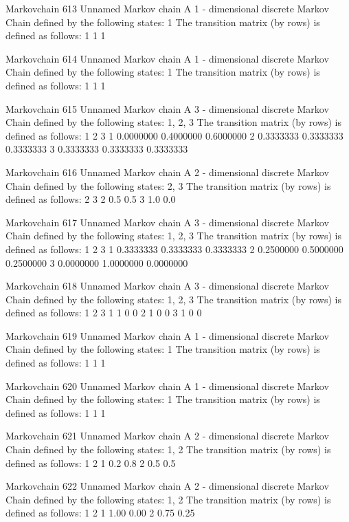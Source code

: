 \documentclass[
  nojss]{jss}
\begin{document}
\begin{CodeChunk}
\begin{CodeOutput}
Markovchain  613 
Unnamed Markov chain 
 A  1 - dimensional discrete Markov Chain defined by the following states: 
 1 
 The transition matrix  (by rows)  is defined as follows: 
  1
1 1

Markovchain  614 
Unnamed Markov chain 
 A  1 - dimensional discrete Markov Chain defined by the following states: 
 1 
 The transition matrix  (by rows)  is defined as follows: 
  1
1 1

Markovchain  615 
Unnamed Markov chain 
 A  3 - dimensional discrete Markov Chain defined by the following states: 
 1, 2, 3 
 The transition matrix  (by rows)  is defined as follows: 
          1         2         3
1 0.0000000 0.4000000 0.6000000
2 0.3333333 0.3333333 0.3333333
3 0.3333333 0.3333333 0.3333333

Markovchain  616 
Unnamed Markov chain 
 A  2 - dimensional discrete Markov Chain defined by the following states: 
 2, 3 
 The transition matrix  (by rows)  is defined as follows: 
    2   3
2 0.5 0.5
3 1.0 0.0

Markovchain  617 
Unnamed Markov chain 
 A  3 - dimensional discrete Markov Chain defined by the following states: 
 1, 2, 3 
 The transition matrix  (by rows)  is defined as follows: 
          1         2         3
1 0.3333333 0.3333333 0.3333333
2 0.2500000 0.5000000 0.2500000
3 0.0000000 1.0000000 0.0000000

Markovchain  618 
Unnamed Markov chain 
 A  3 - dimensional discrete Markov Chain defined by the following states: 
 1, 2, 3 
 The transition matrix  (by rows)  is defined as follows: 
  1 2 3
1 1 0 0
2 1 0 0
3 1 0 0

Markovchain  619 
Unnamed Markov chain 
 A  1 - dimensional discrete Markov Chain defined by the following states: 
 1 
 The transition matrix  (by rows)  is defined as follows: 
  1
1 1

Markovchain  620 
Unnamed Markov chain 
 A  1 - dimensional discrete Markov Chain defined by the following states: 
 1 
 The transition matrix  (by rows)  is defined as follows: 
  1
1 1

Markovchain  621 
Unnamed Markov chain 
 A  2 - dimensional discrete Markov Chain defined by the following states: 
 1, 2 
 The transition matrix  (by rows)  is defined as follows: 
    1   2
1 0.2 0.8
2 0.5 0.5

Markovchain  622 
Unnamed Markov chain 
 A  2 - dimensional discrete Markov Chain defined by the following states: 
 1, 2 
 The transition matrix  (by rows)  is defined as follows: 
     1    2
1 1.00 0.00
2 0.75 0.25


\end{CodeOutput}
\end{CodeChunk}
\end{document}
